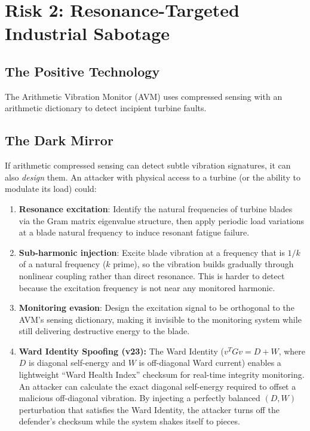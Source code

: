 \documentclass[11pt,a4paper]{article}
\begin{document}
\section{Risk 2: Resonance-Targeted Industrial Sabotage}
\label{sec:vibration}

\subsection{The Positive Technology}

The Arithmetic Vibration Monitor (AVM) uses compressed sensing with
an arithmetic dictionary to detect incipient turbine faults.

\subsection{The Dark Mirror}

If arithmetic compressed sensing can detect subtle vibration
signatures, it can also \emph{design} them. An attacker with
physical access to a turbine (or the ability to modulate its load)
could:

\begin{enumerate}
  \item \textbf{Resonance excitation}: Identify the natural
    frequencies of turbine blades via the Gram matrix eigenvalue
    structure, then apply periodic load variations at a blade
    natural frequency to induce resonant fatigue failure.

  \item \textbf{Sub-harmonic injection}: Excite blade vibration at
    a frequency that is $1/k$ of a natural frequency ($k$ prime),
    so the vibration builds gradually through nonlinear coupling
    rather than direct resonance. This is harder to detect because
    the excitation frequency is not near any monitored harmonic.

  \item \textbf{Monitoring evasion}: Design the excitation signal
    to be orthogonal to the AVM's sensing dictionary, making it
    invisible to the monitoring system while still delivering
    destructive energy to the blade.

  \item \textbf{Ward Identity Spoofing (v23):} The Ward
    Identity ($v^T G v = D + W$, where $D$ is diagonal self-energy
    and $W$ is off-diagonal Ward current) enables a lightweight
    ``Ward Health Index'' checksum for real-time integrity
    monitoring. An attacker can calculate the exact diagonal
    self-energy required to offset a malicious off-diagonal
    vibration. By injecting a perfectly balanced $(D, W)$
    perturbation that satisfies the Ward Identity, the attacker
    turns off the defender's checksum while the system shakes
    itself to pieces.
\end{enumerate}
\end{document}
